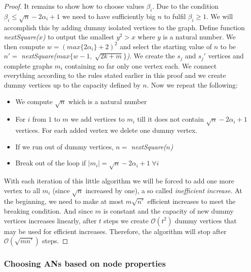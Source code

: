 \begin{proof}
			\noindent It remains to show how to choose values $\beta_{i}$. Due to the condition $\beta_{i} \leq \sqrt{n} - 2\alpha_{i} + 1$ we need to have sufficiently big $n$ to fulfil $\beta_{i} \geq 1$. We will accomplish this by adding dummy isolated vertices to the graph. Define function \textit{nextSquare($x$)} to output the smallest $y^{2} > x$ where $y$ is a natural number. We then compute $w = (max\{2\alpha_{i}\} + 2)^{2}$ and select the starting value of $n$ to be $n' =$ \textit{nextSquare($max\{w - 1, \; \sqrt{2k + m}\}$)}. We create the $s_{j}$ and $s_{j}'$ vertices and complete graphs $m_{i}$ containing so far only one vertex each. We connect everything according to the rules stated earlier in this proof and we create dummy vertices up to the capacity defined by $n$. Now we repeat the following:
			
			\begin{itemize}
				\item We compute $\sqrt{n}$ which is a natural number
				\item For $i$ from $1$ to $m$ we add vertices to $m_{i}$ till it does not contain $\sqrt{n} - 2\alpha_{i} + 1$ vertices. For each added vertex we delete one dummy vertex.
				\item If we run out of dummy vertices, $n =$ \textit{nextSquare($n$)}
				\item Break out of the loop if $|m_{i}| = \sqrt{n} - 2\alpha_{i} + 1 \; \forall i$
			\end{itemize}
			\hspace*{\fill}
			
			\noindent With each iteration of this little algorithm we will be forced to add one more vertex to all $m_{i}$ (since $\sqrt{n}$ increased by one), a so called \textit{inefficient increase}. At the beginning, we need to make at most $m\sqrt{n'}$ efficient increases to meet the breaking condition. And since $m$ is constant and the capacity of new dummy vertices increases linearly, after $t$ steps we create $\mathcal{O}(t^{2})$ dummy vertices that may be used for efficient increases. Therefore, the algorithm will stop after $\mathcal{O}(\sqrt{mn'})$ steps.
		\end{proof}
	
	\subsubsection{Choosing ANs based on node properties}
	
